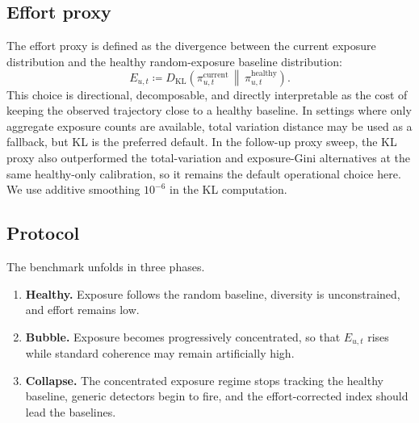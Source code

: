 \subsection*{Effort proxy}
The effort proxy is defined as the divergence between the current exposure
distribution and the healthy random-exposure baseline distribution:
\[
  E_{u,t} \coloneqq D_{\mathrm{KL}}
  \left(
    \pi^{\mathrm{current}}_{u,t}\,\middle\|\,
    \pi^{\mathrm{healthy}}_{u,t}
  \right).
\]
This choice is directional, decomposable, and directly interpretable as the
cost of keeping the observed trajectory close to a healthy baseline. In
settings where only aggregate exposure counts are available, total variation
distance may be used as a fallback, but KL is the preferred default. In the
follow-up proxy sweep, the KL proxy also outperformed the total-variation and
exposure-Gini alternatives at the same healthy-only calibration, so it remains
the default operational choice here.
We use additive smoothing $10^{-6}$ in the KL computation.

\subsection*{Protocol}
The benchmark unfolds in three phases.
\begin{enumerate}[leftmargin=*, label=\textbf{\arabic*.}]
  \item \textbf{Healthy.} Exposure follows the random baseline, diversity is
  unconstrained, and effort remains low.
  \item \textbf{Bubble.} Exposure becomes progressively concentrated, so that
  $E_{u,t}$ rises while standard coherence may remain artificially high.
  \item \textbf{Collapse.} The concentrated exposure regime stops tracking the
  healthy baseline, generic detectors begin to fire, and the effort-corrected
  index should lead the baselines.
\end{enumerate}
